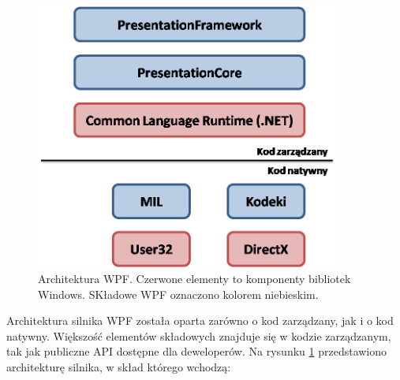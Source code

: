 \begin{figure}[h]
	\includegraphics[width=10cm]{WpfArchitecture}
	\centering
	\caption{Architektura WPF. Czerwone elementy to komponenty bibliotek Windows. SKładowe WPF oznaczono kolorem niebieskim.}
	\label{im: WpfArchitecture}
\end{figure} 

Architektura silnika WPF została oparta zarówno o kod zarządzany, jak i o kod natywny.  Większość elementów składowych znajduje się w kodzie zarządzanym, tak jak publiczne API dostępne dla deweloperów. Na rysunku \ref{im: WpfArchitecture} przedstawiono architekturę silnika, w skład którego wchodzą:

